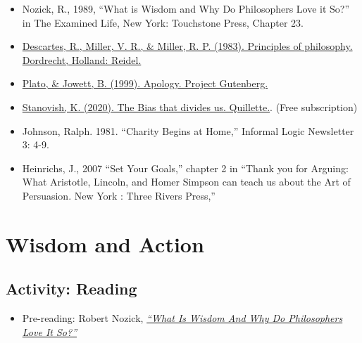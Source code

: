 \documentclass[
]{book}
\providecommand{\tightlist}{%
  \setlength{\itemsep}{0pt}\setlength{\parskip}{0pt}}
\begin{document}
\begin{itemize}
\tightlist
\item
  Nozick, R., 1989, ``What is Wisdom and Why Do Philosophers Love it So?'' in The Examined Life, New York: Touchstone Press, Chapter 23.\\
\item
  \href{https://www.earlymoderntexts.com/assets/pdfs/descartes1644part1.pdf}{Descartes, R., Miller, V. R., \& Miller, R. P. (1983). Principles of philosophy. Dordrecht, Holland: Reidel.}\\
\item
  \href{https://twu.idm.oclc.org/login?url=https://search.ebscohost.com/login.aspx?direct=true\&db=nlebk\&AN=1085368\&site=eds-live\&scope=site\&ebv=EB\&ppid=pp_1}{Plato, \& Jowett, B. (1999). Apology. Project Gutenberg.}\\
\item
  \href{https://quillette.com/2020/09/26/the-bias-that-divides-us/}{Stanovish, K. (2020). The Bias that divides us. Quillette.}. (Free subscription)\\
\item
  Johnson, Ralph. 1981. ``Charity Begins at Home,'' Informal Logic Newsletter 3: 4-9.\\
\item
  Heinrichs, J., 2007 ``Set Your Goals,'' chapter 2 in ``Thank you for Arguing: What Aristotle, Lincoln, and Homer Simpson can teach us about the Art of Persuasion. New York : Three Rivers Press,''
\end{itemize}

\hypertarget{wisdom-and-action}{%
\section{Wisdom and Action}\label{wisdom-and-action}}

\hypertarget{activity-reading}{%
\subsection*{Activity: Reading}\label{activity-reading}}

\begin{reflect}
\begin{itemize}
\tightlist
\item
  Pre-reading: Robert Nozick, \href{assets/u1/PAT_10018662_What_is_Wisdom.pdf}{\emph{``What Is Wisdom And Why Do Philosophers Love It So?''}}
\end{itemize}
\end{reflect}
\end{document}
